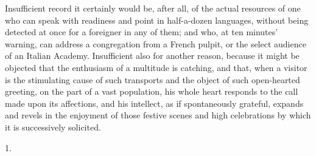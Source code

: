 Insufficient record it
certainly would be, after all, of the actual resources of one who can
speak with readiness and point in half-a-dozen languages, without
being detected at once for a foreigner in any of them; and who, at ten
minutes' warning, can address a congregation from a French pulpit, or
the select audience of an Italian Academy. Insufficient also for
another reason, because it might be objected that the enthusiasm of a
multitude is catching, and that, when a visitor is the stimulating cause of such transports and the object of such
open-hearted greeting, on the part of a vast population, his whole
heart responds to the call made upon its affections, and his
intellect, as if spontaneously grateful, expands and revels in the
enjoyment of those festive scenes and high celebrations by which it is
successively solicited.

1.

